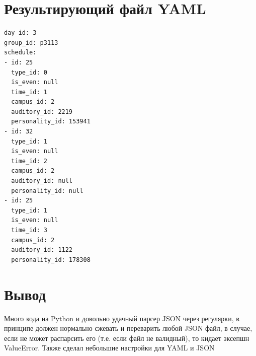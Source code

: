 \documentclass[11pt]{article}
\begin{document}
\section{Результирующий файл YAML}
\label{sec:org219611e}
\lstset{language=yaml,label= ,caption= ,captionpos=b,numbers=none}
\begin{lstlisting}
day_id: 3
group_id: p3113
schedule:
- id: 25
  type_id: 0
  is_even: null
  time_id: 1
  campus_id: 2
  auditory_id: 2219
  personality_id: 153941
- id: 32
  type_id: 1
  is_even: null
  time_id: 2
  campus_id: 2
  auditory_id: null
  personality_id: null
- id: 25
  type_id: 1
  is_even: null
  time_id: 3
  campus_id: 2
  auditory_id: 1122
  personality_id: 178308
\end{lstlisting}
\section{Вывод}
\label{sec:org50e832f}
\normalsize
Много кода на Python и довольно удачный парсер JSON через регулярки, в принципе должен нормально сжевать и переварить любой JSON файл, в случае, если не может распарсить его (т.е. если файл не валидный), то кидает эксепшн ValueError.
Также сделал небольшие настройки для YAML и JSON
\end{document}
